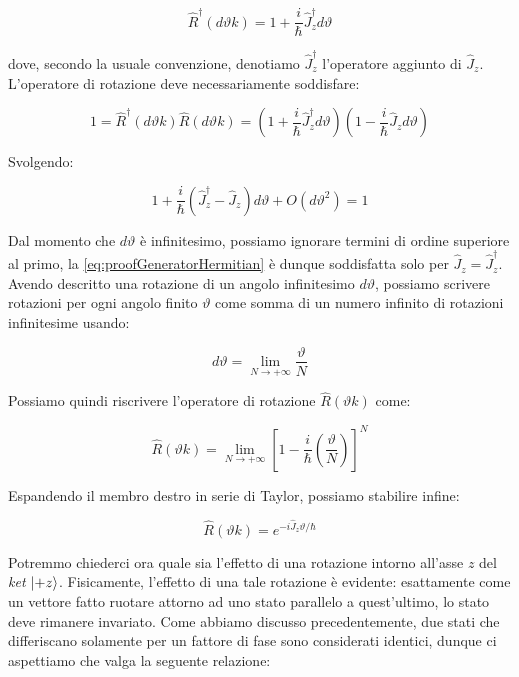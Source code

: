 	\begin{equation} \label{eq:introducingGeneratorRot}
		\hat{R}^\dagger ( { d \vartheta k } ) = 1 + \frac{i}{\hbar} \hat{J}_z^\dagger d \vartheta
	\end{equation}

dove, secondo la usuale convenzione, denotiamo $\hat{J}_z^\dagger$ l'operatore aggiunto di $\hat{J}_z$. L'operatore di rotazione deve necessariamente soddisfare:

	\begin{equation}
	 	1 = \hat{R}^\dagger(d \vartheta k) \hat{R}(d \vartheta k) = \left ( 1 + \frac{i}{\hbar} \hat{J}_z^\dagger d \vartheta \right ) \left ( 1 - \frac{i}{\hbar} \hat{J}_z d \vartheta \right )
	\end{equation}

Svolgendo:

	\begin{equation} \label{eq:proofGeneratorHermitian}
		1 + \frac{i}{\hbar} \left ( \hat{J}^\dagger_z - \hat{J}_z \right ) d \vartheta + O(d \vartheta ^2) = 1
	\end{equation}

Dal momento che $d \vartheta$ \`e infinitesimo, possiamo ignorare termini di ordine superiore al primo, la \eqref{eq:proofGeneratorHermitian} \`e dunque soddisfatta solo per $\hat{J}_z = \hat{J}^\dagger_z$. Avendo descritto una rotazione di un angolo infinitesimo $d \vartheta$, possiamo scrivere rotazioni per ogni angolo finito $\vartheta$ come somma di un numero infinito di rotazioni infinitesime usando:

	\[
		d \vartheta = \lim_{N \to +\infty} \frac{\vartheta}{N}
	\]

Possiamo quindi riscrivere l'operatore di rotazione $\hat{R} (\vartheta k )$ come:

	\begin{equation}
		\hat{R} (\vartheta k ) = \lim_{N \to +\infty} \left [ 1 - \frac{i}{\hbar} \left ( \frac {\vartheta}{N} \right ) \right ] ^ N
	\end{equation}

Espandendo il membro destro in serie di Taylor, possiamo stabilire infine:

	\begin{equation} \label{eq:rOperatorAsExp}
		\hat{R} (\vartheta k ) = e ^ {-i \hat{J}_z \vartheta / \hbar}
	\end{equation}

Potremmo chiederci ora quale sia l'effetto di una rotazione intorno all'asse $z$ del \textit{ket} $\ket{+z}$. Fisicamente, l'effetto di una tale rotazione \`e evidente: esattamente come un vettore fatto ruotare attorno ad uno stato parallelo a quest'ultimo, lo stato deve rimanere invariato. Come abbiamo discusso precedentemente, due stati che differiscano solamente per un fattore di fase sono considerati identici, dunque ci aspettiamo che valga la seguente relazione:

